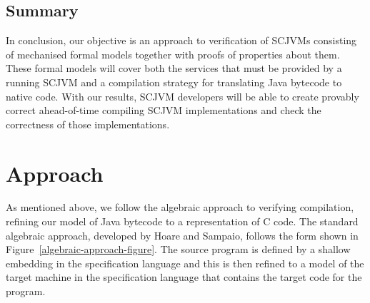 

\subsection{Summary}

In conclusion, our objective is an approach to verification of SCJVMs
consisting of mechanised formal models together with proofs of
properties about them.
These formal models will cover both the services that must be provided
by a running SCJVM and a compilation strategy for translating Java
bytecode to native code.
With our results, SCJVM developers will be able to create provably
correct ahead-of-time compiling SCJVM implementations and check the
correctness of those implementations.

\section{Approach}

As mentioned above, we follow the algebraic approach to verifying
compilation, refining our model of Java bytecode to a representation
of C code.
The standard algebraic approach, developed by Hoare and Sampaio,
follows the form shown in Figure~\ref{algebraic-approach-figure}.
The source program is defined by a shallow embedding in the
specification language and this is then refined to a model of the
target machine in the specification language that contains the target
code for the program.

